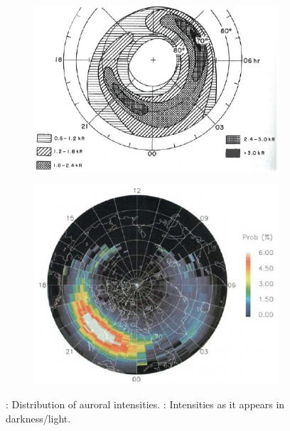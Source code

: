 \begin{figure}[t]
    \centering

    \begin{subfigure}[t]{.47\linewidth}
        \includegraphics[width=.95\linewidth]{bilder/L4_dist_of_auroral_intensities.png}
        \caption{}\label{fig:L4_dist_of_auroral_intensities}
    \end{subfigure}
    \begin{subfigure}[t]{.47\linewidth}
        \includegraphics[width=.95\linewidth]{bilder/L4_intensities_darkness.png}
        \caption{}\label{fig:L4_intensities_darkness}
    \end{subfigure}

    \caption{\textbf{}: Distribution of auroral intensities. \textbf{}: Intensities as it appears in darkness/light.}\label{fig:L4_intensity_distributions}
\end{figure}

